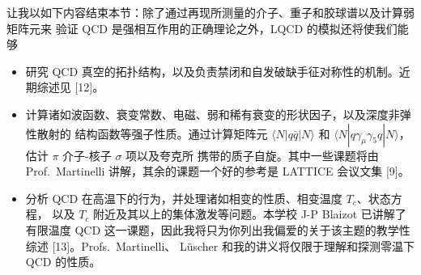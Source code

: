 让我以如下内容结束本节：除了通过再现所测量的介子、重子和胶球谱以及计算弱矩阵元来
验证 QCD 是强相互作用的正确理论之外，LQCD 的模拟还将使我们能够
\begin{itemize}
\item 研究 QCD 真空的拓扑结构，以及负责禁闭和自发破缺手征对称性的机制。近期综述见 [12]。
\item 计算诸如波函数、衰变常数、电磁、弱和稀有衰变的形状因子，以及深度非弹性散射的
结构函数等强子性质。通过计算矩阵元 $\langle N | q\bar{q} | N \rangle$ 和
$\langle N | q\gamma_\mu \gamma_5 q | N \rangle$，估计 $\pi$ 介子-核子 $\sigma$ 项以及夸克所
携带的质子自旋。其中一些课题将由 Prof.~Martinelli 讲解，其余的课题一个好的参考是
LATTICE 会议文集 [9]。
\item 分析 QCD 在高温下的行为，并处理诸如相变的性质、相变温度 $T_c$、状态方程，
以及 $T_c$ 附近及其以上的集体激发等问题。本学校 J-P Blaizot 已讲解了有限温度 QCD
这一课题，因此我将只为你列出我偏爱的关于该主题的教学性综述 [13]。Profs.~Martinelli、
L\"{u}scher 和我的讲义将仅限于理解和探测零温下 QCD 的性质。
\end{itemize}
